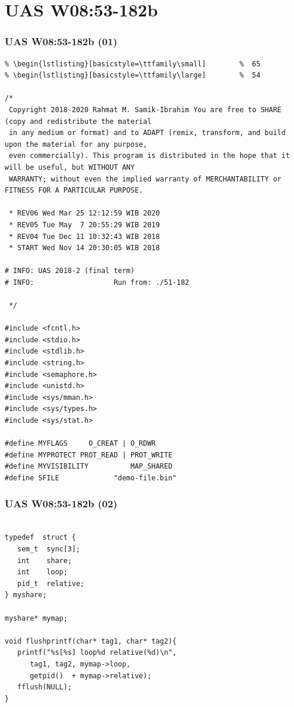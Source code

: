 \documentclass[aspectratio=169, xcolor=table, notheorems, hyperref={pdfpagelabels=false}]{beamer}
\begin{document}
\section{UAS W08:53-182b}
\begin{frame}[fragile]
\frametitle{UAS W08:53-182b (01)}
\begin{lstlisting}[basicstyle=\ttfamily\tiny]         % 108
% \begin{lstlisting}[basicstyle=\ttfamily\footnotesize] %  72
% \begin{lstlisting}[basicstyle=\ttfamily\small]        %  65
% \begin{lstlisting}[basicstyle=\ttfamily\large]        %  54

/*
 Copyright 2018-2020 Rahmat M. Samik-Ibrahim You are free to SHARE (copy and redistribute the material
 in any medium or format) and to ADAPT (remix, transform, and build upon the material for any purpose,
 even commercially). This program is distributed in the hope that it will be useful, but WITHOUT ANY
 WARRANTY; without even the implied warranty of MERCHANTABILITY or FITNESS FOR A PARTICULAR PURPOSE.

 * REV06 Wed Mar 25 12:12:59 WIB 2020
 * REV05 Tue May  7 20:55:29 WIB 2019
 * REV04 Tue Dec 11 10:32:43 WIB 2018
 * START Wed Nov 14 20:30:05 WIB 2018

# INFO: UAS 2018-2 (final term)
# INFO:                   Run from: ./51-182 

 */

#include <fcntl.h>
#include <stdio.h>
#include <stdlib.h>
#include <string.h>
#include <semaphore.h>
#include <unistd.h>
#include <sys/mman.h>
#include <sys/types.h>
#include <sys/stat.h>

#define MYFLAGS     O_CREAT | O_RDWR
#define MYPROTECT PROT_READ | PROT_WRITE
#define MYVISIBILITY          MAP_SHARED 
#define SFILE             "demo-file.bin"

\end{lstlisting}
\end{frame}

\begin{frame}[fragile]
\frametitle{UAS W08:53-182b (02)}
\begin{lstlisting}[basicstyle=\ttfamily\large]        %  54

typedef  struct {
   sem_t  sync[3];
   int    share;
   int    loop;
   pid_t  relative;
} myshare;

myshare* mymap;

void flushprintf(char* tag1, char* tag2){
   printf("%s[%s] loop%d relative(%d)\n", 
      tag1, tag2, mymap->loop, 
      getpid()  + mymap->relative);
   fflush(NULL);
}

\end{lstlisting}
\end{frame}
\end{document}
